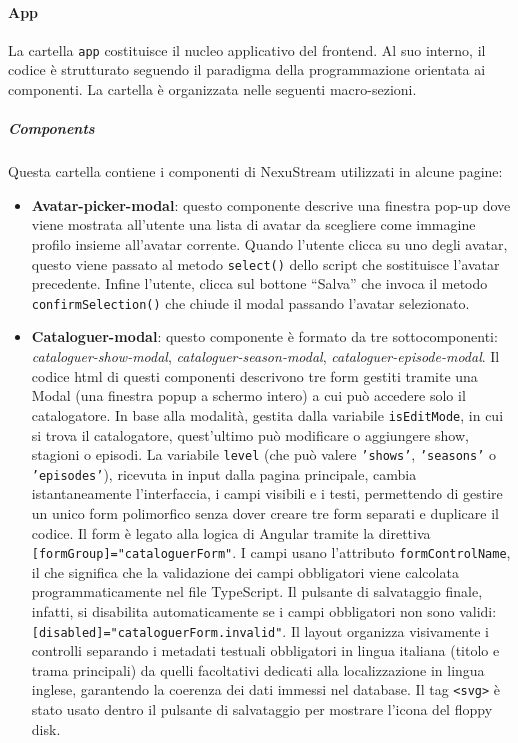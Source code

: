 \documentclass[11pt,a4paper]{article}
\begin{document}
\paragraph{App}
La cartella \texttt{app} costituisce il nucleo applicativo del frontend. Al suo interno, il codice è strutturato seguendo il paradigma della programmazione orientata ai componenti. La cartella è organizzata nelle seguenti macro-sezioni.

\subparagraph{Components}
Questa cartella contiene i componenti di NexuStream utilizzati in alcune pagine:
\begin{itemize}
    \item \textbf{Avatar-picker-modal}: questo componente descrive una finestra pop-up dove viene mostrata all’utente una lista di avatar da scegliere come immagine profilo insieme all’avatar corrente. Quando l’utente clicca su uno degli avatar, questo viene passato al metodo \texttt{select()} dello script che sostituisce l’avatar precedente. Infine l’utente, clicca sul bottone ``Salva'' che invoca il metodo \texttt{confirmSelection()} che chiude il modal passando l’avatar selezionato.
    \item \textbf{Cataloguer-modal}: questo componente è formato da tre sottocomponenti: \textit{cataloguer-show-modal}, \textit{cataloguer-season-modal}, \textit{cataloguer-episode-modal}. Il codice html di questi componenti descrivono tre form gestiti tramite una Modal (una finestra popup a schermo intero) a cui può accedere solo il catalogatore. In base alla modalità, gestita dalla variabile \texttt{isEditMode}, in cui si trova il catalogatore, quest’ultimo può modificare o aggiungere show, stagioni o episodi. La variabile \texttt{level} (che può valere \texttt{'shows'}, \texttt{'seasons'} o \texttt{'episodes'}), ricevuta in input dalla pagina principale, cambia istantaneamente l'interfaccia, i campi visibili e i testi, permettendo di gestire un unico form polimorfico senza dover creare tre form separati e duplicare il codice. Il form è legato alla logica di Angular tramite la direttiva \texttt{[formGroup]="cataloguerForm"}. I campi usano l'attributo \texttt{formControlName}, il che significa che la validazione dei campi obbligatori viene calcolata programmaticamente nel file TypeScript. Il pulsante di salvataggio finale, infatti, si disabilita automaticamente se i campi obbligatori non sono validi: \texttt{[disabled]="cataloguerForm.invalid"}. Il layout organizza visivamente i controlli separando i metadati testuali obbligatori in lingua italiana (titolo e trama principali) da quelli facoltativi dedicati alla localizzazione in lingua inglese, garantendo la coerenza dei dati immessi nel database. Il tag \texttt{<svg>} è stato usato dentro il pulsante di salvataggio per mostrare l'icona del floppy disk.
    

\end{itemize}
\end{document}
